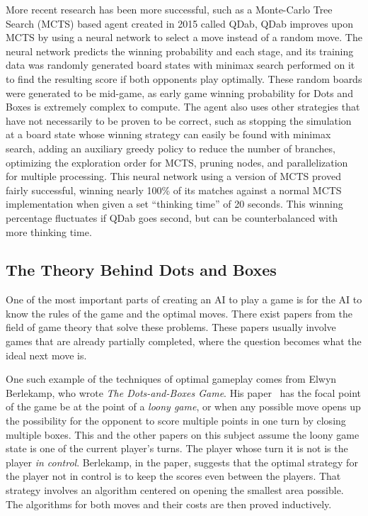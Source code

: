 \documentclass[12pt]{article}
\begin{document}
    More recent research has been more successful, such as a Monte-Carlo Tree Search (MCTS) based agent created in 2015 called QDab, QDab improves upon MCTS by using a neural network to select a move instead of a random move. The neural network predicts the winning probability and each stage, and its training data was randomly generated board states with minimax search performed on it to find the resulting score if both opponents play optimally. These random boards were generated to be mid-game, as early game winning probability for Dots and Boxes is extremely complex to compute. The agent also uses other strategies that have not necessarily to be proven to be correct, such as stopping the simulation at a board state whose winning strategy can easily be found with minimax search, adding an auxiliary greedy policy to reduce the number of branches, optimizing the exploration order for MCTS, pruning nodes, and parallelization for multiple processing. This neural network using a version of MCTS proved fairly successful, winning nearly 100\% of its matches against a normal MCTS implementation when given a set ``thinking time'' of 20 seconds. This winning percentage fluctuates if QDab goes second, but can be counterbalanced with more thinking time. 
    
    \subsection{The Theory Behind Dots and Boxes}

    One of the most important parts of creating an AI to play a game is for the AI to know the rules of the game and the optimal moves. There exist papers from the field of game theory that solve these problems. These papers usually involve games that are already partially completed, where the question becomes what the ideal next move is.

    One such example of the techniques of optimal gameplay comes from Elwyn Berlekamp, who wrote \emph{The Dots-and-Boxes Game}. His paper~\cite{berlekamp2000} has the focal point of the game be at the point of a \emph{loony game}, or when any possible move opens up the possibility for the opponent to score multiple points in one turn by closing multiple boxes. This and the other papers on this subject assume the loony game state is one of the current player's turns. The player whose turn it is not is the player \emph{in control}. Berlekamp, in the paper, suggests that the optimal strategy for the player not in control is to keep the scores even between the players. That strategy involves an algorithm centered on opening the smallest area possible. The algorithms for both moves and their costs are then proved inductively.
\end{document}
